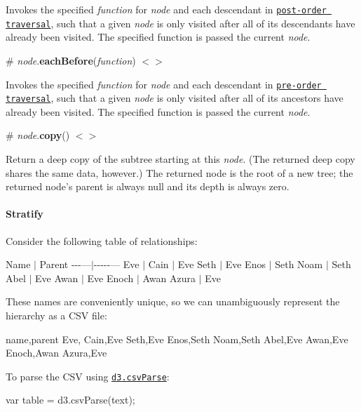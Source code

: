 Invokes the specified {\itshape function} for {\itshape node} and each descendant in \href{https://en.wikipedia.org/wiki/Tree_traversal#Post-order}{\tt post-\/order traversal}, such that a given {\itshape node} is only visited after all of its descendants have already been visited. The specified function is passed the current {\itshape node}.

\label{_node_eachBefore}%
\# {\itshape node}.{\bfseries each\+Before}({\itshape function}) \href{https://github.com/d3/d3-hierarchy/blob/master/src/hierarchy/eachBefore.js}{\tt $<$$>$}

Invokes the specified {\itshape function} for {\itshape node} and each descendant in \href{https://en.wikipedia.org/wiki/Tree_traversal#Pre-order}{\tt pre-\/order traversal}, such that a given {\itshape node} is only visited after all of its ancestors have already been visited. The specified function is passed the current {\itshape node}.

\label{_node_copy}%
\# {\itshape node}.{\bfseries copy}() \href{https://github.com/d3/d3-hierarchy/blob/master/src/hierarchy/index.js#L39}{\tt $<$$>$}

Return a deep copy of the subtree starting at this {\itshape node}. (The returned deep copy shares the same data, however.) The returned node is the root of a new tree; the returned node’s parent is always null and its depth is always zero.

\paragraph*{Stratify}

Consider the following table of relationships\+:

Name $\vert$ Parent -\/-\/-\/---$\vert$-\/-\/-\/-\/-\/--- Eve $\vert$ Cain $\vert$ Eve Seth $\vert$ Eve Enos $\vert$ Seth Noam $\vert$ Seth Abel $\vert$ Eve Awan $\vert$ Eve Enoch $\vert$ Awan Azura $\vert$ Eve

These names are conveniently unique, so we can unambiguously represent the hierarchy as a C\+SV file\+:


\begin{DoxyCode}
name,parent
Eve,
Cain,Eve
Seth,Eve
Enos,Seth
Noam,Seth
Abel,Eve
Awan,Eve
Enoch,Awan
Azura,Eve
\end{DoxyCode}


To parse the C\+SV using \href{https://github.com/d3/d3-dsv#csvParse}{\tt d3.\+csv\+Parse}\+:


\begin{DoxyCode}
var table = d3.csvParse(text);
\end{DoxyCode}



